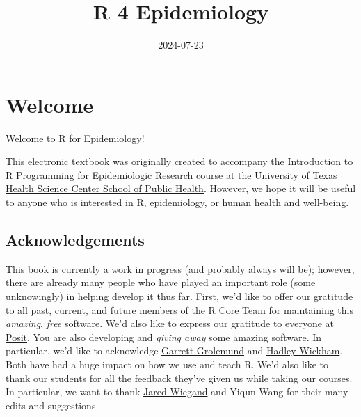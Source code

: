 \documentclass[
  letterpaper,
  DIV=11,
  numbers=noendperiod]{scrreprt}
\title{R 4 Epidemiology}
\author{}
\date{2024-07-23}
\renewcommand*\contentsname{Table of contents}
\newcommand\contentsname{Table of contents}
\begin{document}
\maketitle

\renewcommand*\contentsname{Table of contents}
{
\hypersetup{linkcolor=}
\setcounter{tocdepth}{2}
\tableofcontents
}

\chapter*{Welcome}\label{welcome}


Welcome to R for Epidemiology!

This electronic textbook was originally created to accompany the
Introduction to R Programming for Epidemiologic Research course at the
\href{https://sph.uth.edu/}{University of Texas Health Science Center
School of Public Health}. However, we hope it will be useful to anyone
who is interested in R, epidemiology, or human health and well-being.

\section*{Acknowledgements}\label{acknowledgements}


This book is currently a work in progress (and probably always will be);
however, there are already many people who have played an important role
(some unknowingly) in helping develop it thus far. First, we'd like to
offer our gratitude to all past, current, and future members of the R
Core Team for maintaining this \emph{amazing}, \emph{free} software.
We'd also like to express our gratitude to everyone at
\href{https://posit.co/}{Posit}. You are also developing and
\emph{giving away} some amazing software. In particular, we'd like to
acknowledge
\href{https://www.linkedin.com/in/garrett-grolemund-49328411/}{Garrett
Grolemund} and \href{https://hadley.nz/}{Hadley Wickham}. Both have had
a huge impact on how we use and teach R. We'd also like to thank our
students for all the feedback they've given us while taking our courses.
In particular, we want to thank
\href{https://www.linkedin.com/in/jared-wiegand/}{Jared Wiegand} and
Yiqun Wang for their many edits and suggestions.
\end{document}

